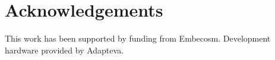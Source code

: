 \documentclass[twocolumn]{article}
\newcommand{\nsection}[1]{\section{\bfseries #1}}
\newcommand{\todo}[1]{\textbf{\textcolor{red}{#1}}}
\begin{document}


\nsection{Acknowledgements}

This work has been supported by funding from Embecosm\cite{Embecosm}. Development hardware provided by Adapteva\cite{Adapteva}.

\printbibliography
\end{document}
